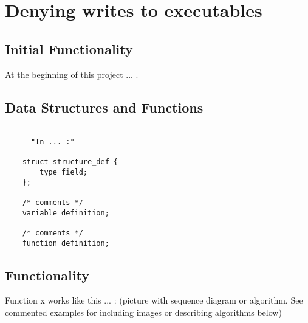 {\section{Denying writes to executables}

     \subsection{Initial Functionality}

	At the beginning of this project ... .

    \subsection{Data Structures and Functions}

    \begin{lstlisting}

      "In ... :"
	
	struct structure_def {
	    type field;
	};

	/* comments */
	variable definition;

	/* comments */
	function definition;

    \end{lstlisting}


    \subsection{Functionality}

	Function x works like this ... : (picture with sequence diagram or algorithm. See commented examples for including images or describing algorithms below)






}
